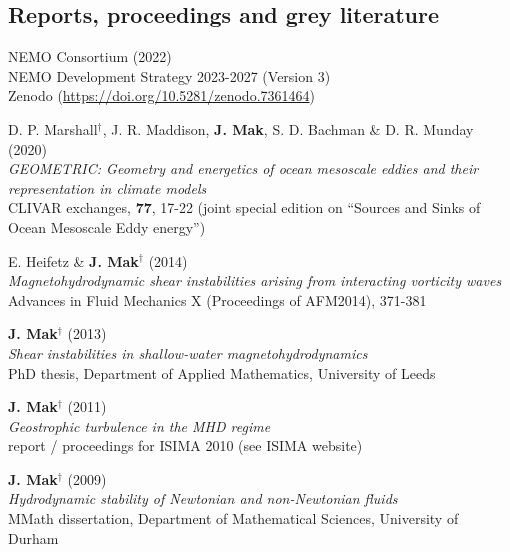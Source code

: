 \documentclass[letterpaper]{article}
\renewenvironment{itemize}{
  \begin{list}{}{
    \setlength{\leftmargin}{1.5em}
  }
}{
  \end{list}
}
\begin{document}
\subsection*{Reports, proceedings and grey literature}
\begin{itemize}

\item[F.] NEMO Consortium (2022)\\
NEMO Development Strategy 2023-2027 (Version 3)\\
Zenodo (\url{https://doi.org/10.5281/zenodo.7361464})

\item[E.] D. P. Marshall$^{\dagger}$, J. R. Maddison, \textbf{J. Mak}, S. D. Bachman \& D. R. Munday (2020)\\
\textit{GEOMETRIC: Geometry and energetics of ocean mesoscale eddies and their representation in climate models}\\
CLIVAR exchanges, \textbf{77}, 17-22 (joint special edition on ``Sources and Sinks
of Ocean Mesoscale Eddy energy'')

\item[D.] E. Heifetz \& \textbf{J. Mak}$^{\dagger}$ (2014)\\
\textit{Magnetohydrodynamic shear instabilities arising from interacting
vorticity waves}\\
Advances in Fluid Mechanics X (Proceedings of AFM2014), 371-381

\item[C.] \textbf{J. Mak}$^{\dagger}$ (2013)\\
\textit{Shear instabilities in shallow-water magnetohydrodynamics}\\
PhD thesis, Department of Applied Mathematics, University of Leeds

\item[B.] \textbf{J. Mak}$^{\dagger}$ (2011)\\
\textit{Geostrophic turbulence in the MHD regime}\\
report / proceedings for ISIMA 2010 (see ISIMA website)

\item[A.] \textbf{J. Mak}$^{\dagger}$ (2009)\\
\textit{Hydrodynamic stability of Newtonian and non-Newtonian fluids}\\
MMath dissertation, Department of Mathematical Sciences, University of Durham
\end{itemize}

\end{document}
